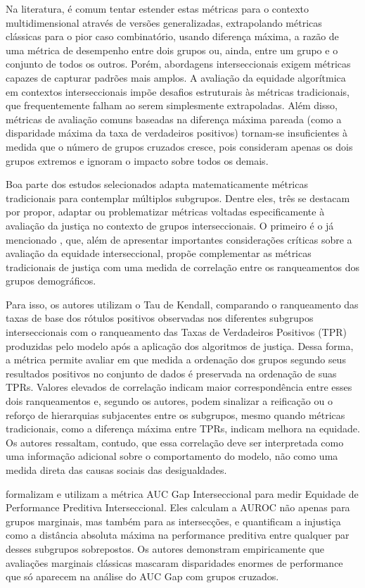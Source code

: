 Na literatura, é comum tentar estender estas métricas para o contexto multidimensional através de versões generalizadas, extrapolando métricas clássicas para o pior caso combinatório, usando diferença máxima, a razão de uma métrica de desempenho entre dois grupos ou, ainda, entre um grupo e o conjunto de todos os outros. Porém, abordagens interseccionais exigem métricas capazes de capturar padrões mais amplos. A avaliação da equidade algorítmica em contextos interseccionais impõe desafios estruturais às métricas tradicionais, que frequentemente falham ao serem simplesmente extrapoladas. Além disso, métricas de avaliação comuns baseadas na diferença máxima pareada (como a disparidade máxima da taxa de verdadeiros positivos) tornam-se insuficientes à medida que o número de grupos cruzados cresce, pois consideram apenas os dois grupos extremos e ignoram o impacto sobre todos os demais.

Boa parte dos estudos selecionados adapta matematicamente métricas tradicionais para contemplar múltiplos subgrupos. Dentre eles, três se destacam por propor, adaptar ou problematizar métricas voltadas especificamente à avaliação da justiça no contexto de grupos interseccionais. O primeiro é o já mencionado \citet{wang2022towards}, que, além de apresentar importantes considerações críticas sobre a avaliação da equidade interseccional, propõe complementar as métricas tradicionais de justiça com uma medida de correlação entre os ranqueamentos dos grupos demográficos.

Para isso, os autores utilizam o Tau de Kendall, comparando o ranqueamento das taxas de base dos rótulos positivos observadas nos diferentes subgrupos interseccionais com o ranqueamento das Taxas de Verdadeiros Positivos (TPR) produzidas pelo modelo após a aplicação dos algoritmos de justiça. Dessa forma, a métrica permite avaliar em que medida a ordenação dos grupos segundo seus resultados positivos no conjunto de dados é preservada na ordenação de suas TPRs. Valores elevados de correlação indicam maior correspondência entre esses dois ranqueamentos e, segundo os autores, podem sinalizar a reificação ou o reforço de hierarquias subjacentes entre os subgrupos, mesmo quando métricas tradicionais, como a diferença máxima entre TPRs, indicam melhora na equidade. Os autores ressaltam, contudo, que essa correlação deve ser interpretada como uma informação adicional sobre o comportamento do modelo, não como uma medida direta das causas sociais das desigualdades.

\citet{gardner2023cross} formalizam e utilizam a métrica AUC Gap Interseccional para medir Equidade de Performance Preditiva Interseccional. Eles calculam a AUROC não apenas para grupos marginais, mas também para as intersecções, e quantificam a injustiça como a distância absoluta máxima na performance preditiva entre qualquer par desses subgrupos sobrepostos. Os autores demonstram empiricamente que avaliações marginais clássicas mascaram disparidades enormes de performance que só aparecem na análise do AUC Gap com grupos cruzados.

